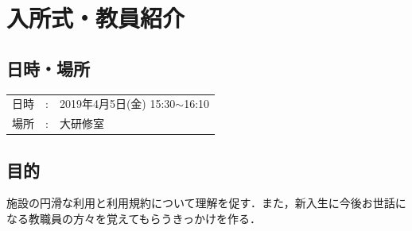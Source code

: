 
%
\section{入所式・教員紹介}

\subsection{日時・場所}
\begin{tabular}{p{}rp{}}
  日時 & : & 2019年4月5日(金) 15:30$\sim$16:10\\
  場所 & : & 大研修室
\end{tabular}

\subsection{目的}
施設の円滑な利用と利用規約について理解を促す．また，新入生に今後お世話になる教職員の方々を覚えてもらうきっかけを作る．

